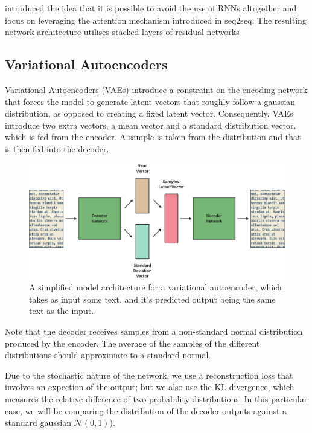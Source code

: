 \documentclass[12pt,twoside]{report}
\begin{document}
\cite{vaswani_attention_2017} introduced the idea that it is possible to avoid the use of RNNs altogether and focus on leveraging the attention mechanism introduced in seq2seq. The resulting network architecture utilises stacked layers of residual networks 

\subsection{Variational Autoencoders}

Variational Autoencoders (VAEs) introduce a constraint on the encoding network that forces the model to generate latent vectors that roughly follow a gaussian distribution, as opposed to creating a fixed latent vector. Consequently, VAEs introduce two extra vectors, a mean vector and a standard distribution vector, which is fed from the encoder. A sample is taken from the distribution and that is then fed into the decoder.

\begin{figure}[!ht]
      
	\centering
	\includegraphics[width=150mm]{diagrams/variational_autoencoders.pdf}
	\caption{A simplified model architecture for a variational autoencoder, which takes as input some text, and it's predicted output being the same text as the input.\label{vae}}
  \end{figure}

  Note that the decoder receives samples from a non-standard normal distribution produced by the encoder. The average of the samples of the different distributions should approximate to a standard normal.
  
  Due to the stochastic nature of the network, we use a reconstruction loss that involves an expection of the output; but we also use the KL divergence, which  measures the relative difference of two probability distributions. In this particular case, we will be comparing the distribution of the decoder outputs against a standard gaussian $ \mathcal{N}(0,1)$).
  
\end{document}
